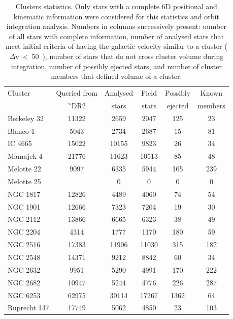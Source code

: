 \begin{table}
	\centering
	\caption{Clusters statistics. Only stars with a complete 6D positional and kinematic information were considered for this statistics and orbit integration analysis. Numbers in columns successively present: number of all stars with complete information, number of analysed stars that meet initial criteria of having the galactic velocity similar to a cluster ($\Delta$v~<~50~\kms), number of stars that do not cross cluster volume during integration, number of possibly ejected stars, and number of cluster members that defined volume of a cluster.}
	\begin{tabular}{l | c | c | c | c | c }
		\hline
		Cluster & Queried from & Analysed & Field & Possibly & Known \\
		 & \G\ DR2 & stars & stars & ejected & members \\
		\hline
		Berkeley 32  & 11322 & 2659 & 2047 & 125 & 23 \\ 
		Blanco 1     & 5043 & 2734 & 2687 & 15 & 81 \\
		IC 4665      & 15022 & 10155 & 9823 & 26 & 34 \\
		Mamajek 4    & 21776 & 11623 & 10513 & 85 & 48 \\
		Melotte 22   & 9097 & 6335 & 5944 & 105 & 239 \\
		Melotte 25   & \rb{TBD} & 0 & 0 & 0 & 0 \\
		NGC 1817     & 12826 & 4489 & 4060 & 74 & 54 \\
		NGC 1901     & 12666 & 7323 & 7204 & 19 & 30 \\
		NGC 2112     & 13866 & 6665 & 6323 & 38 & 49 \\
		NGC 2204     & 4314 & 1777 & 1170 & 180 & 59 \\
		NGC 2516     & 17383 & 11906 & 11030 & 315 & 182 \\
		NGC 2548     & 14371 & 9212 & 8842 & 60 & 34 \\
		NGC 2632     & 9951 & 5290 & 4991 & 170 & 222 \\
		NGC 2682     & 10947 & 5244 & 4776 & 226 & 287 \\
		NGC 6253     & 62975 & 30114 & 17267 & 1362 & 64 \\
		Ruprecht 147 & 17749 & 5062 & 4850 & 23 & 103 \\
		\hline
	\end{tabular}
	\label{tab:cluster_stats}
\end{table}

